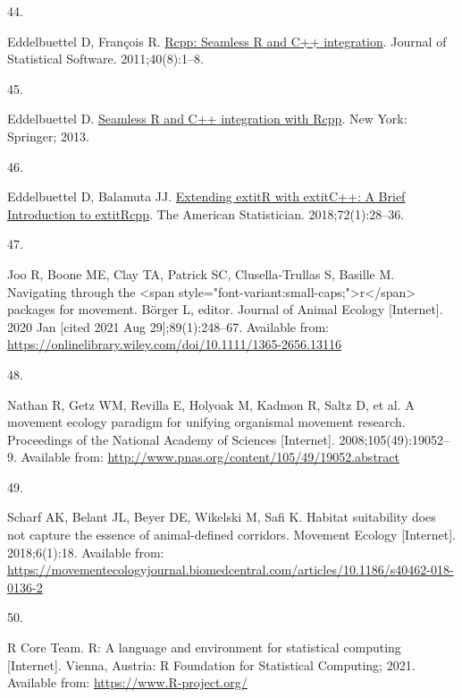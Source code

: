 \documentclass[10pt,a4paper]{article}
\newlength{\cslhangindent}
\newlength{\csllabelwidth}
\newlength{\cslentryspacingunit} %
\newenvironment{CSLReferences}[2] %
 {%
  \setlength{\parindent}{0pt}
  \ifodd #1
  \let\oldpar\par
  \def\par{\hangindent=\cslhangindent\oldpar}
  \fi
  \setlength{\parskip}{#2\cslentryspacingunit}
 }%
 {}
\newcommand{\CSLLeftMargin}[1]{\parbox[t]{\csllabelwidth}{#1}}
\newcommand{\CSLRightInline}[1]{\parbox[t]{\linewidth - \csllabelwidth}{#1}\break}
\begin{document}
\begin{CSLReferences}{0}{0}
\leavevmode{}%
\CSLLeftMargin{44. }
\CSLRightInline{Eddelbuettel D, François R. \href{https://doi.org/10.18637/jss.v040.i08}{{Rcpp}: Seamless {R} and {C++} integration}. Journal of Statistical Software. 2011;40(8):1--8. }

\leavevmode{}%
\CSLLeftMargin{45. }
\CSLRightInline{Eddelbuettel D. \href{https://doi.org/10.1007/978-1-4614-6868-4}{Seamless {R} and {C++} integration with {Rcpp}}. New York: Springer; 2013. }

\leavevmode{}%
\CSLLeftMargin{46. }
\CSLRightInline{Eddelbuettel D, Balamuta JJ. \href{https://doi.org/10.1080/00031305.2017.1375990}{{Extending extit{R} with extit{C++}: A Brief Introduction to extit{Rcpp}}}. The American Statistician. 2018;72(1):28--36. }

\leavevmode{}%
\CSLLeftMargin{47. }
\CSLRightInline{Joo R, Boone ME, Clay TA, Patrick SC, Clusella‐Trullas S, Basille M. Navigating through the {\textless{}}span style="font-variant:small-caps;"{\textgreater{}}r{\textless{}}/span{\textgreater{}} packages for movement. Börger L, editor. Journal of Animal Ecology {[}Internet{]}. 2020 Jan {[}cited 2021 Aug 29{]};89(1):248--67. Available from: \url{https://onlinelibrary.wiley.com/doi/10.1111/1365-2656.13116}}

\leavevmode{}%
\CSLLeftMargin{48. }
\CSLRightInline{Nathan R, Getz WM, Revilla E, Holyoak M, Kadmon R, Saltz D, et al. A movement ecology paradigm for unifying organismal movement research. Proceedings of the National Academy of Sciences {[}Internet{]}. 2008;105(49):19052--9. Available from: \url{http://www.pnas.org/content/105/49/19052.abstract}}

\leavevmode{}%
\CSLLeftMargin{49. }
\CSLRightInline{Scharf AK, Belant JL, Beyer DE, Wikelski M, Safi K. Habitat suitability does not capture the essence of animal-defined corridors. Movement Ecology {[}Internet{]}. 2018;6(1):18. Available from: \url{https://movementecologyjournal.biomedcentral.com/articles/10.1186/s40462-018-0136-2}}

\leavevmode{}%
\CSLLeftMargin{50. }
\CSLRightInline{R Core Team. R: A language and environment for statistical computing {[}Internet{]}. Vienna, Austria: R Foundation for Statistical Computing; 2021. Available from: \url{https://www.R-project.org/}}


\end{CSLReferences}
\end{document}
